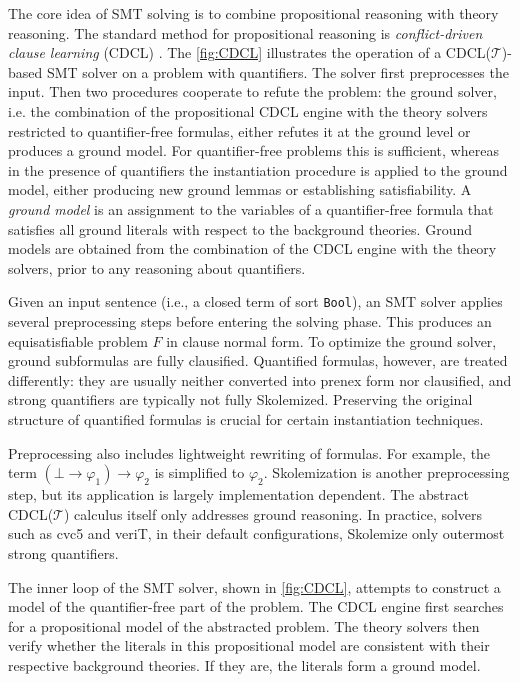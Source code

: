 The core idea of SMT solving is to combine propositional reasoning with theory reasoning.
The standard method for propositional reasoning is \emph{conflict-driven clause learning} (CDCL) \cite{dpll}.
The \cref{fig:CDCL} illustrates the operation of a CDCL($\mathcal{T}$)-based SMT solver on a problem with quantifiers.
The solver first preprocesses the input.
Then two procedures cooperate to refute the problem: the ground solver, i.e. the combination of the propositional CDCL engine with the theory solvers restricted to quantifier-free formulas, either refutes it at the ground level or produces a ground model.
For quantifier-free problems this is sufficient, whereas in the presence of quantifiers the instantiation procedure is applied to the ground model, either producing new ground lemmas or establishing satisfiability.
A \emph{ground model} is an assignment to the variables of a quantifier-free formula that satisfies all ground literals with respect to the background theories.
Ground models are obtained from the combination of the CDCL engine with the theory solvers, prior to any reasoning about quantifiers.

Given an input sentence (i.e., a closed term of sort \texttt{Bool}), an SMT solver applies several preprocessing steps before entering the solving phase.
This produces an equisatisfiable problem $F$ in clause normal form.
To optimize the ground solver, ground subformulas are fully clausified.
Quantified formulas, however, are treated differently: they are usually neither converted into prenex form nor clausified, and strong quantifiers \cite{BAAZ2001273} are typically not fully Skolemized.
Preserving the original structure of quantified formulas is crucial for certain instantiation techniques.

Preprocessing also includes lightweight rewriting of formulas.
For example, the term $(\bot \to \varphi_1) \to \varphi_2$ is simplified to $\varphi_2$.
Skolemization is another preprocessing step, but its application is largely implementation dependent.
The abstract CDCL($\mathcal{T}$) calculus itself only addresses ground reasoning.
In practice, solvers such as cvc5 and veriT, in their default configurations, Skolemize only outermost strong quantifiers.


The inner loop of the SMT solver, shown in \cref{fig:CDCL}, attempts to construct a model of the quantifier-free part of the problem.
The CDCL engine first searches for a propositional model of the abstracted problem.
The theory solvers then verify whether the literals in this propositional model are consistent with their respective background theories.
If they are, the literals form a ground model.



